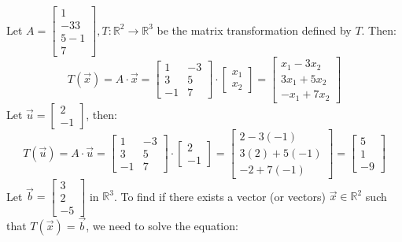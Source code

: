 \begin{eg}
    Let $A = \begin{bmatrix}
        1 \\ -3
        3 \\ 5
        -1 \\ 7
    \end{bmatrix}, T: \mathbb{R}^2 \to \mathbb{R}^3$ be the matrix transformation defined by $T$. Then:
    \[
        T(\vec{x}) = A \cdot \vec{x} = \begin{bmatrix}
            1 & -3 \\
            3 & 5 \\
            -1 & 7
        \end{bmatrix} \cdot \begin{bmatrix} x_1 \\ x_2 \end{bmatrix} = \begin{bmatrix}
            x_1 - 3x_2 \\
            3x_1 + 5x_2 \\
            -x_1 + 7x_2
        \end{bmatrix}
    \]
    Let $\vec{u} = \begin{bmatrix} 2 \\ -1 \end{bmatrix}$, then:
    \[
        T(\vec{u}) = A \cdot \vec{u} = \begin{bmatrix}
            1 & -3 \\
            3 & 5 \\
            -1 & 7
        \end{bmatrix} \cdot \begin{bmatrix} 2 \\ -1 \end{bmatrix} = \begin{bmatrix}
            2 - 3(-1) \\
            3(2) + 5(-1) \\
            -2 + 7(-1)
        \end{bmatrix} = \begin{bmatrix}
            5 \\ 1 \\ -9
        \end{bmatrix}
    \]
    Let $\vec{b} = \begin{bmatrix} 3 \\ 2 \\ -5 \end{bmatrix}$ in $\mathbb{R}^3$. To find if there exists a vector (or vectors) $\vec{x} \in \mathbb{R}^2$ such that $T(\vec{x}) = \vec{b}$, we need to solve the equation:

\end{eg}
